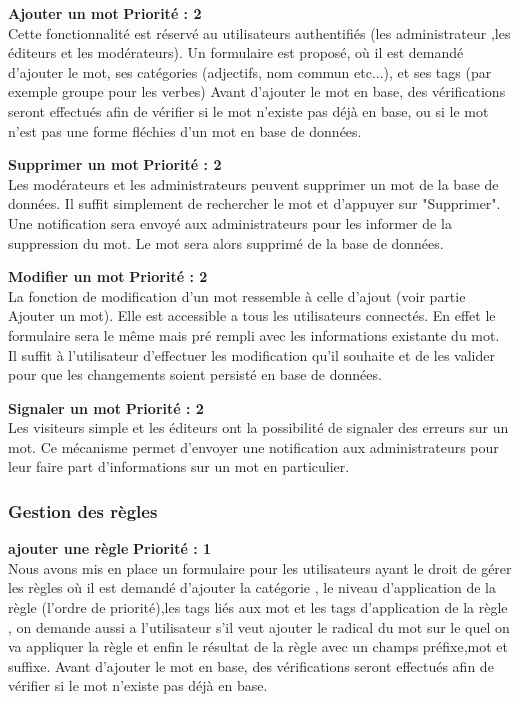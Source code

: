 \documentclass[12pt,a4paper]{article}
\begin{document}
\textbf{Ajouter un mot}
 \textbf{Priorité : 2}
\\ Cette fonctionnalité est réservé au utilisateurs authentifiés (les administrateur ,les éditeurs et les modérateurs). Un formulaire est proposé, où il est demandé d'ajouter le mot, ses catégories (adjectifs, nom commun etc...), et ses tags (par exemple groupe pour les verbes)
Avant d'ajouter le mot en base, des vérifications seront effectués afin  de vérifier si le mot n'existe pas déjà en base, ou si le mot n'est pas une forme fléchies d'un mot en base de données.


\textbf{Supprimer un mot}
 \textbf{Priorité : 2} \\ 
 Les modérateurs et les administrateurs peuvent supprimer un mot de la base de données. Il suffit simplement de rechercher le mot et d'appuyer sur "Supprimer". Une notification sera envoyé aux administrateurs pour les informer de la suppression du mot. Le mot sera alors supprimé de la base de données.

\textbf{Modifier un mot}
 \textbf{Priorité : 2} \\ 
 La fonction de modification d'un mot ressemble à celle d'ajout (voir partie Ajouter un mot). Elle est accessible a tous les utilisateurs connectés. En effet le formulaire sera le même mais pré rempli avec les informations existante du mot. Il suffit à  l'utilisateur d'effectuer les modification qu'il souhaite et de les valider pour que les changements soient persisté en base de données.

\textbf{Signaler un mot}
 \textbf{Priorité : 2}
 \\ Les visiteurs simple et les éditeurs ont la possibilité de signaler des erreurs sur un mot. Ce mécanisme permet d'envoyer une notification aux administrateurs pour leur faire part d'informations sur un mot en particulier. 
\subsubsection{Gestion des règles }
\textbf{ajouter une règle } \textbf{Priorité : 1} \\ Nous avons mis en place un formulaire pour les utilisateurs ayant le droit de gérer les règles où il est demandé d'ajouter la catégorie , le niveau d'application de la règle (l'ordre de priorité),les tags liés aux mot et les tags d'application de la règle , on demande aussi a l'utilisateur s'il veut ajouter le radical du mot sur le quel on va appliquer la règle et enfin le résultat de la règle avec un champs préfixe,mot et suffixe.
Avant d'ajouter le mot en base, des vérifications seront effectués afin  de vérifier si le mot n'existe pas déjà en base.
\end{document}
